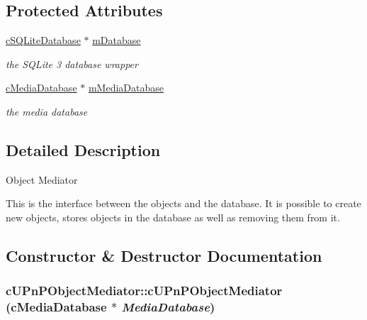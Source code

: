 \subsection*{Protected Attributes}
\begin{CompactItemize}
\item 
\hypertarget{classcUPnPObjectMediator_e4c8b57a4ebeee1cd55306d436a10541}{
\hyperlink{classcSQLiteDatabase}{cSQLiteDatabase} $\ast$ \hyperlink{classcUPnPObjectMediator_e4c8b57a4ebeee1cd55306d436a10541}{mDatabase}}
\label{classcUPnPObjectMediator_e4c8b57a4ebeee1cd55306d436a10541}

\begin{CompactList}\small\item\em the SQLite 3 database wrapper \item\end{CompactList}\item 
\hypertarget{classcUPnPObjectMediator_dbdaa3de8276658a0f8d91d24a789ddf}{
\hyperlink{classcMediaDatabase}{cMediaDatabase} $\ast$ \hyperlink{classcUPnPObjectMediator_dbdaa3de8276658a0f8d91d24a789ddf}{mMediaDatabase}}
\label{classcUPnPObjectMediator_dbdaa3de8276658a0f8d91d24a789ddf}

\begin{CompactList}\small\item\em the media database \item\end{CompactList}\end{CompactItemize}


\subsection{Detailed Description}
Object Mediator

This is the interface between the objects and the database. It is possible to create new objects, stores objects in the database as well as removing them from it. 

\subsection{Constructor \& Destructor Documentation}
\hypertarget{classcUPnPObjectMediator_1bc635808c95f6bd774046c37b8139a1}{
\subsubsection[{cUPnPObjectMediator}]{\setlength{\rightskip}{0pt plus 5cm}cUPnPObjectMediator::cUPnPObjectMediator ({\bf cMediaDatabase} $\ast$ {\em MediaDatabase})}}
\label{classcUPnPObjectMediator_1bc635808c95f6bd774046c37b8139a1}


